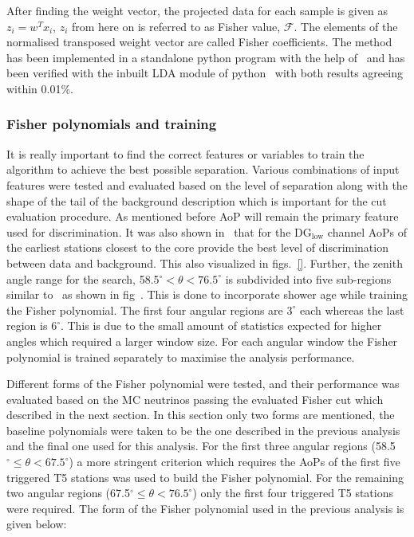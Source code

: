 After finding the weight vector, the projected data for each sample is given as $z_i = w^Tx_i$, $z_i$ from here on is referred to as Fisher value, $\mathcal{F}$. The elements of the normalised transposed weight vector are called Fisher coefficients. The method has been implemented in a standalone python program with the help of~\cite{JaimeAlvarezMuniz_conversation} and has been verified with the inbuilt LDA module of python~\cite{scikit_Learn} with both results agreeing within 0.01\%. 

\subsubsection{Fisher polynomials and training}
\label{subsubsec:nu_sel_fisher_training}
It is really important to find the correct features or variables to train the algorithm to achieve the best possible separation. Various combinations of input features were tested and evaluated based on the level of separation along with the shape of the tail of the background description which is important for the cut evaluation procedure. As mentioned before AoP will remain the primary feature used for discrimination. It was also shown in~\cite{gap_note_2013} that for the DG$\mathrm{_{low}}$ channel AoPs of the earliest stations closest to the core provide the best level of discrimination between data and background. This also visualized in figs.~\ref{}. Further, the zenith angle range for the search, 58.5$^\circ < \theta < 76.5^\circ$ is subdivided into five sub-regions similar to~\cite{gap_note_2013} as shown in fig~\cite{}. This is done to incorporate shower age while training the Fisher polynomial. The first four angular regions are $3^\circ$ each whereas the last region is $6^\circ$. This is due to the small amount of statistics expected for higher angles which required a larger window size. For each angular window the Fisher polynomial is trained separately to maximise the analysis performance. 

Different forms of the Fisher polynomial were tested, and their performance was evaluated based on the MC neutrinos passing the evaluated Fisher cut which described in the next section. In this section only two forms are mentioned, the baseline polynomials were taken to be the one described in the previous analysis~\cite{gap_note_2013} and the final one used for this analysis. For the first three angular regions (58.5$^\circ \leq \theta < 67.5^\circ$) a more stringent criterion which requires the AoPs of the first five triggered T5 stations was used to build the Fisher polynomial. For the remaining two angular regions (67.5$^\circ \leq \theta < 76.5^\circ$) only the first four triggered T5 stations were required. The form of the Fisher polynomial used in the previous analysis is given below:

